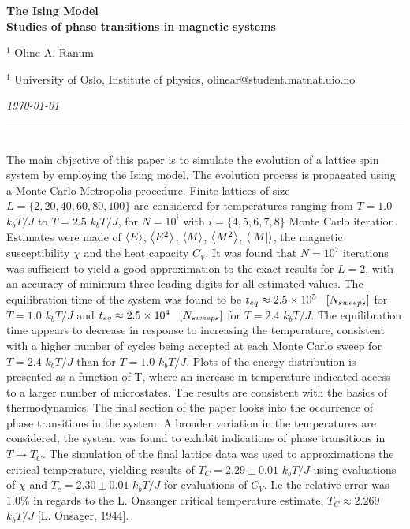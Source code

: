 \documentclass[%
reprint,nofootinbib,
amsmath,amssymb,
aps,
]{revtex4-1}
\newcommand{\HRule}{\rule{\textwidth}{0.5mm}}
\begin{document}
\onecolumngrid

\begin{center}
	\large\textbf{The Ising Model\\ \small{Studies of phase transitions in magnetic systems}}
\end{center}
\vspace{5mm}

\begin{center}
	\small{$^1$ Oline A. Ranum}\\
\end{center}

\begin{center}
	\small{$^1$ University of Oslo, Institute of physics, 
		olinear@student.matnat.uio.no}
\end{center}

\begin{center}
	\textit{\today}
\end{center}
\vspace{7mm}
\noindent 
\HRule \vspace{2mm}\\
The main objective of this paper is to simulate the evolution of a lattice  spin system by employing the Ising model. The evolution process is propagated using a Monte Carlo Metropolis procedure. Finite lattices of size $L = \{2, 20, 40, 60, 80, 100\}$ are considered for temperatures ranging from $T = 1.0$ $k_bT/J$ to $T = 2.5$  $k_bT/J$, for $N = 10^i$ with $i = \{4, 5, 6, 7, 8\}$  Monte Carlo iteration. Estimates were made of $\expval{E}$, $\expval{E^2}$, $\expval{M}$, $\expval{M^2}$, $\expval{\abs{M}}$, the magnetic susceptibility $\chi$ and the heat capacity $C_V$. It was found that  $N = 10^7$ iterations was sufficient to yield a good approximation to the exact results for $L = 2$, with an accuracy of minimum three leading digits for all estimated values. The equilibration time of the system was found to be $
t_{eq} \approx 2.5\times10^5 \hspace{3mm}[N_{sweeps}]$ for  $T = 1.0$ $k_bT/J$   and $t_{eq} \approx 2.5\times10^4 \hspace{3mm}[N_{sweeps}]$ for $T = 2.4$ $k_bT/J$. The equilibration time appears to decrease in response to increasing the temperature, consistent with a higher number of cycles being accepted at each Monte Carlo sweep for $T =2.4 $ $k_bT/J$ than for $T = 1.0$ $k_bT/J$. Plots of the energy distribution is presented as a function of T, where an increase in temperature indicated access to a larger number of microstates. The results are consistent with the basics of thermodynamics. The final section of the paper looks into the occurrence of phase transitions in the system.  A broader variation in the temperatures are considered, the system was found to exhibit indications of phase transitions in $T\rightarrow T_C$. The simulation of the final lattice data was used to approximations the critical temperature, yielding results of $T_C = 2.29 \pm 0.01$  $k_bT/J$ using evaluations of $\chi$ and $T_c = 2.30 \pm 0.01$ $k_bT/J$ for evaluations of $C_V$.  I.e the relative error was $1.0\%$ in regards to the L. Onsanger critical temperature estimate, $T_C \approx 2.269$ $k_bT/J$ [L. Onsager, 1944]. 
\end{document}
